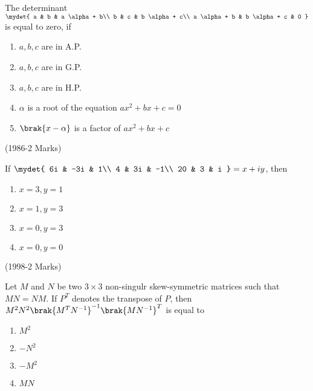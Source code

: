 \iffalse
\title{Matrices and Determinants}
\author{AI24BTECH11015 - Harshvardhan Patidar}
\section{mcq-multiple}
\fi

    \item
        The determinant $
                \mydet{
                    a & b & a \alpha + b\\
                    b & c & b \alpha + c\\
                    a \alpha + b & b \alpha + c & 0
                }
        $ is equal to zero, if
            \begin{enumerate}
                        \item $a,b,c$ are in A.P.
                        \item $a,b,c$ are in G.P.
                        \item $a,b,c$ are in H.P.
                        \item $\alpha$ is a root of the equation $ax^2 + bx +c=0$
                        \item $\brak{x-\alpha}$ is a factor of $ax^2 + bx +c$
            \end{enumerate}
            \hfill (1986-2 Marks)
    \item 
        If $
        \mydet{
            6i & -3i & 1\\
            4 & 3i & -1\\
            20 & 3 & i
        } = x +iy$, then 
        \begin{enumerate}
            \item $x=3,y=1$
            \item $x=1,y=3$
            \item $x=0,y=3$
            \item $x=0,y=0$
        \end{enumerate}
        \hfill (1998-2 Marks)
    \item 
        Let $M$ and $N$ be two $3 \times 3$ non-singulr skew-symmetric matrices such that $MN=NM$. If $P^T$ denotes the transpose of $P$, then $M^2N^2\brak{M^TN^{-1}}^{-1} \brak{MN^{-1}}^T$ is equal to 
        \begin{enumerate}
            \item $M^2$
            \item $-N^2$
            \item $-M^2$
            \item $MN$
        \end{enumerate}
